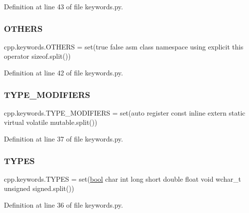 Definition at line 43 of file keywords.\+py.

\mbox{\label{namespacecpp_1_1keywords_a15fe231fbad145538b73892804898809}} 
\subsubsection{\texorpdfstring{O\+T\+H\+E\+RS}{OTHERS}}
{\footnotesize\ttfamily cpp.\+keywords.\+O\+T\+H\+E\+RS = set(\textquotesingle{}true false asm class namespace using explicit this operator sizeof\textquotesingle{}.split())}



Definition at line 42 of file keywords.\+py.

\mbox{\label{namespacecpp_1_1keywords_af9282ce418d6b4b43dca5ed574caedd7}} 
\subsubsection{\texorpdfstring{T\+Y\+P\+E\+\_\+\+M\+O\+D\+I\+F\+I\+E\+RS}{TYPE\_MODIFIERS}}
{\footnotesize\ttfamily cpp.\+keywords.\+T\+Y\+P\+E\+\_\+\+M\+O\+D\+I\+F\+I\+E\+RS = set(\textquotesingle{}auto register const inline extern static virtual volatile mutable\textquotesingle{}.split())}



Definition at line 37 of file keywords.\+py.

\mbox{\label{namespacecpp_1_1keywords_a56fd5baf357970548e1ec366edfc2c13}} 
\subsubsection{\texorpdfstring{T\+Y\+P\+ES}{TYPES}}
{\footnotesize\ttfamily cpp.\+keywords.\+T\+Y\+P\+ES = set(\textquotesingle{}\hyperlink{classbool}{bool} char int long short double float void wchar\+\_\+t unsigned signed\textquotesingle{}.split())}



Definition at line 36 of file keywords.\+py.

